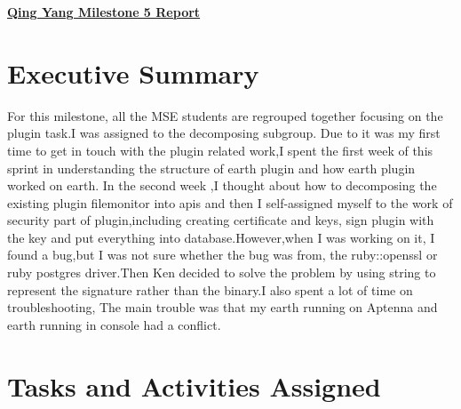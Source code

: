 \begin{center}
{\large\textbf{\underline{{Qing Yang Milestone 5 Report}}}}
\end{center}

\section*{Executive Summary}
For this milestone, all the MSE students are regrouped together focusing on the plugin task.I was assigned to the decomposing subgroup. Due to it was my first time to get in touch with the plugin related work,I spent the first week of this sprint in understanding the structure of earth plugin and how earth plugin worked on earth.
In the second week ,I thought about how to decomposing the existing plugin filemonitor into apis and then I self-assigned myself to the work of security part of plugin,including creating certificate and keys, sign plugin with the key and put everything into database.However,when I was working on it, I found a bug,but I was not sure whether the bug was from, the ruby::openssl or ruby postgres driver.Then Ken decided to solve the problem by using string to represent the signature rather than the binary.I also spent a lot of time on troubleshooting, The main trouble was that my earth running on Aptenna and earth running in console had a conflict.

\section*{Tasks and Activities Assigned}

